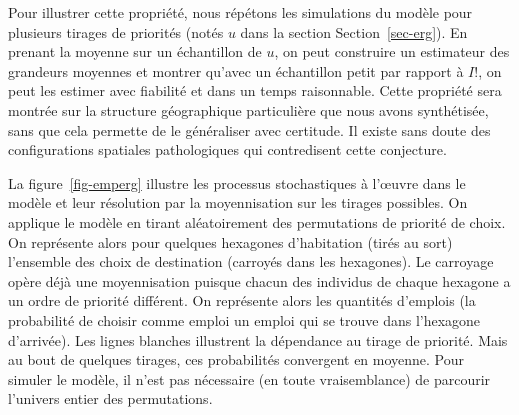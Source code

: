 \documentclass[
  10pt,
  a4paper,
  numbers=noendperiod,
  DIV=12]{scrartcl}
\begin{document}
Pour illustrer cette propriété, nous répétons les simulations du modèle
pour plusieurs tirages de priorités (notés \(u\) dans la section
Section~\ref{sec-erg}). En prenant la moyenne sur un échantillon de
\(u\), on peut construire un estimateur des grandeurs moyennes et
montrer qu'avec un échantillon petit par rapport à \(I!\), on peut les
estimer avec fiabilité et dans un temps raisonnable. Cette propriété
sera montrée sur la structure géographique particulière que nous avons
synthétisée, sans que cela permette de le généraliser avec certitude. Il
existe sans doute des configurations spatiales pathologiques qui
contredisent cette conjecture.

La figure~\ref{fig-emperg} illustre les processus stochastiques à
l'œuvre dans le modèle et leur résolution par la moyennisation sur les
tirages possibles. On applique le modèle en tirant aléatoirement des
permutations de priorité de choix. On représente alors pour quelques
hexagones d'habitation (tirés au sort) l'ensemble des choix de
destination (carroyés dans les hexagones). Le carroyage opère déjà une
moyennisation puisque chacun des individus de chaque hexagone a un ordre
de priorité différent. On représente alors les quantités d'emplois (la
probabilité de choisir comme emploi un emploi qui se trouve dans
l'hexagone d'arrivée). Les lignes blanches illustrent la dépendance au
tirage de priorité. Mais au bout de quelques tirages, ces probabilités
convergent en moyenne. Pour simuler le modèle, il n'est pas nécessaire
(en toute vraisemblance) de parcourir l'univers entier des permutations.
\end{document}
